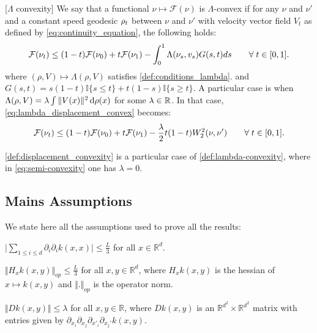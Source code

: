 \begin{definition}\label{def:lambda-convexity}[$\Lambda$ convexity]
	We say that a functional $\nu\mapsto\mathcal{F}(\nu)$ is $\Lambda$-convex
	if for any $\nu$ and $\nu'$ and a constant speed geodesic $\text{\ensuremath{\rho_{t}}}$
	between $\nu$ and $\nu'$ with velocity vector field $V_{t}$ as defined by \cref{eq:continuity_equation},
	the following holds:
	\begin{equation}\label{eq:lambda_displacement_convex}
		{{\mathcal F}}(\nu_{t})\leq(1-t){{\mathcal F}}(\nu_{0})+t{{\mathcal F}}(\nu_{1})-\int_{0}^{1}\Lambda(\nu_{s},v_{s})G(s,t)ds \qquad\forall\; t\in[0,1].
	\end{equation}
	where $(\rho,V)\mapsto\Lambda(\rho,V)$ satisfies \cref{def:conditions_lambda}.
	and $G(s,t)=s(1-t) \mathbb{I}\{s\leq t\}
	+t(1-s) \mathbb{I}\{s\geq t\}$.
	A particular case is when $\Lambda(\rho,V)= \lambda \int \Vert V(x) \Vert^2 \mathop{}\!\mathrm{d} \rho(x)   $ for some $\lambda\in {{\mathbb R}}$. In that case, \cref{eq:lambda_displacement_convex} becomes:
\begin{align}\label{eq:semi-convexity}
	{{\mathcal F}}(\nu_{t})\leq(1-t){{\mathcal F}}(\nu_{0})+t{{\mathcal F}}(\nu_{1})-\frac{\lambda}{2}t(1-t)W_2^2(\nu,\nu')  \qquad\forall\; t\in[0,1].
\end{align}
\end{definition}
\cref{def:displacement_convexity} is a particular case of \cref{def:lambda-convexity}, where in \cref{eq:semi-convexity} one has $\lambda =0$.


\subsection{Mains Assumptions}
We state here all the assumptions used to prove all the results:
\begin{assumplist} 
	\item \label{assump:bounded_trace} $ \vert \sum_{1\leq i\leq d} \partial_i\partial_ik(x,x) \vert\leq \frac{L}{3}  $ for all $x\in \mathbb{R}^d$.
	\item \label{assump:bounded_hessian} $\Vert H_xk(x,y) \Vert_{op} \leq \frac{L}{3}$ for all $x,y\in \mathbb{R}^d$, where $H_xk(x,y)$ is the hessian of $x\mapsto k(x,y)$ and $\Vert.\Vert_{op}$ is the operator norm.
	\item \label{assump:bounded_fourth_oder} $\Vert Dk(x,y) \Vert\leq \lambda  $ for all $x,y\in \mathbb{R}$, where $Dk(x,y)$ is an $\mathbb{R}^{d^2}\times \mathbb{R}^{d^2}$ matrix with entries given by $\partial_{x_{i}}\partial_{x_{j}}\partial_{x'_{i}}\partial_{x_{j}'}k(x,y)$.
\end{assumplist}


